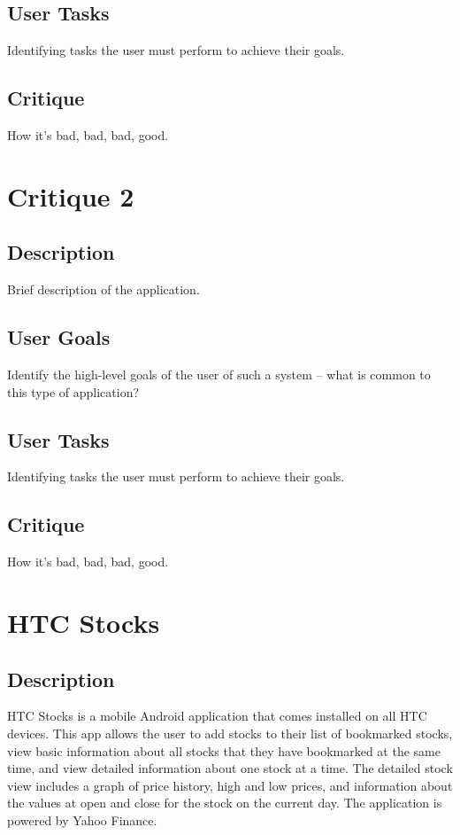 \documentclass{sigchi}
\begin{document}
\subsection{User Tasks}
Identifying tasks the user must perform to achieve their goals.

\subsection{Critique}
How it's bad, bad, bad, good.



\section{Critique 2}
\subsection{Description}
Brief description of the application.

\subsection{User Goals}
Identify the high-level goals of the user of such a system – what is common to this type of
application?

\subsection{User Tasks}
Identifying tasks the user must perform to achieve their goals.

\subsection{Critique}
How it's bad, bad, bad, good.



\section{HTC Stocks}
\subsection{Description}
HTC Stocks is a mobile Android application that comes installed on all HTC devices.  
This app allows the user to add stocks to their list of bookmarked stocks, view basic information
about all stocks that they have bookmarked at the same time, and view detailed information about
one stock at a time.  The detailed stock view includes a graph of price history, high and low prices, 
and information about the values at open and close for the stock on the current day.  The application
is powered by Yahoo Finance.
\end{document}
